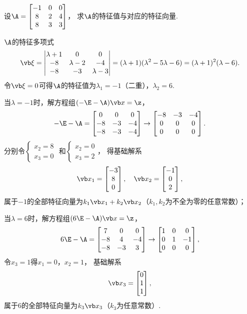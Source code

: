 \begin{example}
设\(\A = \begin{bmatrix} -1 & 0 & 0 \\ 8 & 2 & 4 \\ 8 & 3 & 3 \end{bmatrix}\)，
求\(\A\)的特征值与对应的特征向量.
\begin{solution}
\(\A\)的特征多项式\[
	\a = \begin{vmatrix}
		\lambda+1 & 0 & 0 \\
		-8 & \lambda-2 & -4 \\
		-8 & -3 & \lambda-3
	\end{vmatrix}
	= (\lambda+1)(\lambda^2-5\lambda-6)
	= (\lambda+1)^2(\lambda-6).
\]
令\(\a = 0\)可得\(\A\)的特征值为\(\lambda_1=-1\)（二重），\(\lambda_2=6\).

当\(\lambda=-1\)时，解方程组\((-\E-\A)\x=\z\)，\[
	-\E-\A
	= \begin{bmatrix} 0 & 0 & 0 \\ -8 & -3 & -4 \\ -8 & -3 & -4 \end{bmatrix}
	\to \begin{bmatrix} -8 & -3 & -4 \\ 0 & 0 & 0 \\ 0 & 0 & 0 \end{bmatrix}.
\]
分别令\(\left\{ \begin{array}{l} x_2=8 \\ x_3=0 \end{array} \right.\)
和\(\left\{ \begin{array}{l} x_2=0 \\ x_3=2 \end{array} \right.\)，
得基础解系\[
	\x_1 = \begin{bmatrix} -3 \\ 8 \\ 0 \end{bmatrix},
	\quad
	\x_2 = \begin{bmatrix} -1 \\ 0 \\ 2 \end{bmatrix},
\]
属于\(-1\)的全部特征向量为\(k_1\x_1+k_2\x_2\)（\(k_1,k_2\)为不全为零的任意常数）；

当\(\lambda=6\)时，解方程组\((6\E-\A)\x=\z\)，\[
	6\E-\A
	= \begin{bmatrix} 7 & 0 & 0 \\ -8 & 4 & -4 \\ -8 & -3 & 3 \end{bmatrix}
	\to \begin{bmatrix} 1 & 0 & 0 \\ 0 & 1 & -1 \\ 0 & 0 & 0 \end{bmatrix},
\]
令\(x_3=1\)得\(x_1=0\)，\(x_2=1\)，
基础解系\[
	\x_3 = \begin{bmatrix} 0 \\ 1 \\ 1 \end{bmatrix},
\]
属于\(6\)的全部特征向量为\(k_3\x_3\)（\(k_3\)为任意常数）.
\end{solution}
\end{example}

